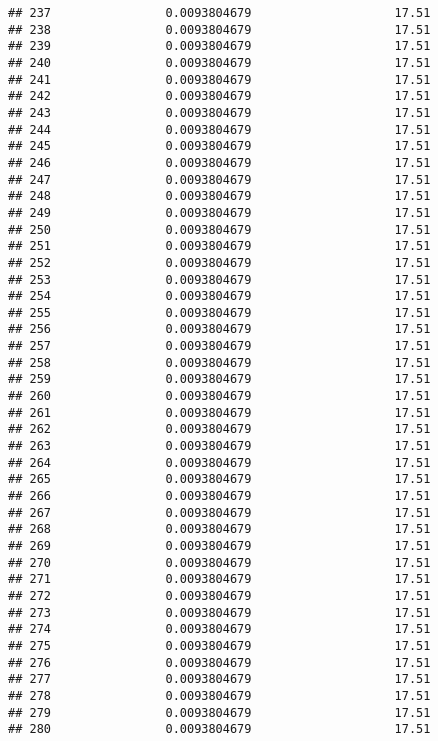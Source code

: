 \documentclass[]{article}
\begin{document}
\begin{verbatim}
## 237                0.0093804679                    17.51
## 238                0.0093804679                    17.51
## 239                0.0093804679                    17.51
## 240                0.0093804679                    17.51
## 241                0.0093804679                    17.51
## 242                0.0093804679                    17.51
## 243                0.0093804679                    17.51
## 244                0.0093804679                    17.51
## 245                0.0093804679                    17.51
## 246                0.0093804679                    17.51
## 247                0.0093804679                    17.51
## 248                0.0093804679                    17.51
## 249                0.0093804679                    17.51
## 250                0.0093804679                    17.51
## 251                0.0093804679                    17.51
## 252                0.0093804679                    17.51
## 253                0.0093804679                    17.51
## 254                0.0093804679                    17.51
## 255                0.0093804679                    17.51
## 256                0.0093804679                    17.51
## 257                0.0093804679                    17.51
## 258                0.0093804679                    17.51
## 259                0.0093804679                    17.51
## 260                0.0093804679                    17.51
## 261                0.0093804679                    17.51
## 262                0.0093804679                    17.51
## 263                0.0093804679                    17.51
## 264                0.0093804679                    17.51
## 265                0.0093804679                    17.51
## 266                0.0093804679                    17.51
## 267                0.0093804679                    17.51
## 268                0.0093804679                    17.51
## 269                0.0093804679                    17.51
## 270                0.0093804679                    17.51
## 271                0.0093804679                    17.51
## 272                0.0093804679                    17.51
## 273                0.0093804679                    17.51
## 274                0.0093804679                    17.51
## 275                0.0093804679                    17.51
## 276                0.0093804679                    17.51
## 277                0.0093804679                    17.51
## 278                0.0093804679                    17.51
## 279                0.0093804679                    17.51
## 280                0.0093804679                    17.51

\end{verbatim}
\end{document}
